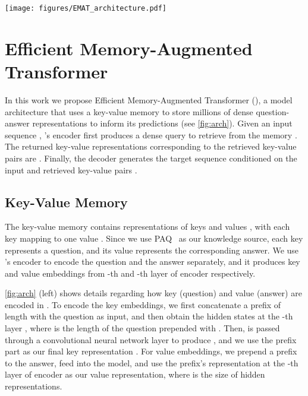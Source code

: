 \begin{figure*}[t]
\begin{center}
\texttt{[image: figures/EMAT\_architecture.pdf]}
\end{center}
\caption{
Architecture of the proposed Efficient Key-Value Memory Augmented Transformers (EMAT): factual knowledge is stored in a key-value memory (\cref{sec:kvm}) where keys and values correspond to questions and answers, respectively;
during inference, the model retrieves information from the memory via MIPS (\cref{sec:retriever}) and uses it to condition the generation process.
}
\label{fig:arch}
\end{figure*}

\section{Efficient Memory-Augmented Transformer}  \label{sec:emat}


In this work we propose Efficient Memory-Augmented Transformer (\ModelName), a model architecture that uses a key-value memory to store millions of dense question-answer representations to inform its predictions (see \cref{fig:arch}).
Given an input sequence , \ModelName's encoder first produces a dense query  to retrieve from the memory .
The returned key-value representations corresponding to the retrieved  key-value pairs are .
Finally, the decoder generates the target sequence  conditioned on the input  and retrieved key-value pairs .




\subsection{Key-Value Memory} \label{sec:kvm}


The key-value memory  contains representations of keys  and values , with each key  mapping to one value .
Since we use PAQ~\citep{paq} as our knowledge source, each key represents a question, and its value represents the corresponding answer.
We use \ModelName's encoder to encode the question and the answer separately, and it produces key and value embeddings from -th and -th layer of encoder respectively.


\cref{fig:arch} (left) shows details regarding how key (question) and value (answer) are encoded in \ModelName.
To encode the key embeddings, we first concatenate a prefix  of length  with the question  as input, and then obtain the hidden states at the -th layer , where  is the length of the question  prepended with \prefix.
Then,  is passed through a convolutional neural network layer to produce , 
and we use the prefix part as our final key representation  .
For value embeddings, we prepend a prefix to the answer, feed  into the model,
and use the prefix's representation at the -th layer of encoder  as our value representation, where  is the size of hidden representations.




